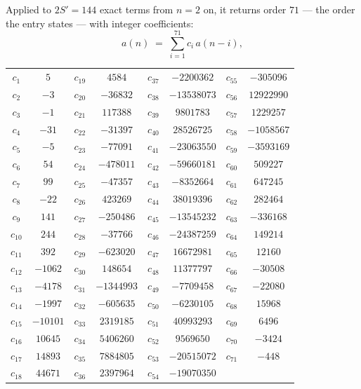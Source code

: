 \documentclass[11pt,a4paper]{article}
\theoremstyle{plain}
\theoremstyle{definition}
\begin{document}
Applied to $2S'=144$ exact terms from $n=2$ on, it returns order $71$ --- the
order the entry states --- with integer coefficients:
\[
a(n)\;=\;\sum_{i=1}^{71}c_i\,a(n-i),
\]
\begin{center}\small
\begin{tabular}{cccccccc}
$c_{1}$ & $5$ & $c_{19}$ & $4584$ & $c_{37}$ & $-2200362$ & $c_{55}$ & $-305096$ \\
$c_{2}$ & $-3$ & $c_{20}$ & $-36832$ & $c_{38}$ & $-13538073$ & $c_{56}$ & $12922990$ \\
$c_{3}$ & $-1$ & $c_{21}$ & $117388$ & $c_{39}$ & $9801783$ & $c_{57}$ & $1229257$ \\
$c_{4}$ & $-31$ & $c_{22}$ & $-31397$ & $c_{40}$ & $28526725$ & $c_{58}$ & $-1058567$ \\
$c_{5}$ & $-5$ & $c_{23}$ & $-77091$ & $c_{41}$ & $-23063550$ & $c_{59}$ & $-3593169$ \\
$c_{6}$ & $54$ & $c_{24}$ & $-478011$ & $c_{42}$ & $-59660181$ & $c_{60}$ & $509227$ \\
$c_{7}$ & $99$ & $c_{25}$ & $-47357$ & $c_{43}$ & $-8352664$ & $c_{61}$ & $647245$ \\
$c_{8}$ & $-22$ & $c_{26}$ & $423269$ & $c_{44}$ & $38019396$ & $c_{62}$ & $282464$ \\
$c_{9}$ & $141$ & $c_{27}$ & $-250486$ & $c_{45}$ & $-13545232$ & $c_{63}$ & $-336168$ \\
$c_{10}$ & $244$ & $c_{28}$ & $-37766$ & $c_{46}$ & $-24387259$ & $c_{64}$ & $149214$ \\
$c_{11}$ & $392$ & $c_{29}$ & $-623020$ & $c_{47}$ & $16672981$ & $c_{65}$ & $12160$ \\
$c_{12}$ & $-1062$ & $c_{30}$ & $148654$ & $c_{48}$ & $11377797$ & $c_{66}$ & $-30508$ \\
$c_{13}$ & $-4178$ & $c_{31}$ & $-1344993$ & $c_{49}$ & $-7709458$ & $c_{67}$ & $-22080$ \\
$c_{14}$ & $-1997$ & $c_{32}$ & $-605635$ & $c_{50}$ & $-6230105$ & $c_{68}$ & $15968$ \\
$c_{15}$ & $-10101$ & $c_{33}$ & $2319185$ & $c_{51}$ & $40993293$ & $c_{69}$ & $6496$ \\
$c_{16}$ & $10645$ & $c_{34}$ & $5406260$ & $c_{52}$ & $9569650$ & $c_{70}$ & $-3424$ \\
$c_{17}$ & $14893$ & $c_{35}$ & $7884805$ & $c_{53}$ & $-20515072$ & $c_{71}$ & $-448$ \\
$c_{18}$ & $44671$ & $c_{36}$ & $2397964$ & $c_{54}$ & $-19070350$ &  &  \\
\end{tabular}
\end{center}
\end{document}
